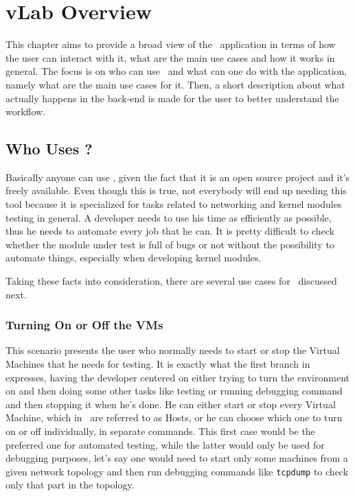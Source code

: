 \chapter{vLab Overview}
\label{chapter:Chapter 3}

This chapter aims to provide a broad view of the \project\ application in terms of how the user can interact with it, what are the main use cases and how it works in general.
The focus is on who can use \project\ and what can one do with the application, namely what are the main use cases for it.
Then, a short description about what actually happens in the back-end is made for the user to better understand the workflow.

\section{Who Uses \project?}
\label{sec:who-uses-vlab}

Basically anyone can use \project, given the fact that it is an open source project and it's freely available.
Even though this is true, not everybody will end up needing this tool because it is specialized for tasks related to networking and kernel modules testing in general.
A developer needs to use his time as efficiently as possible, thus he needs to automate every job that he can.
It is pretty difficult to check whether the module under test is full of bugs or not without the possibility to automate things, especially when developing kernel modules.

Taking these facts into consideration, there are several use cases for \project\ discussed next.

\subsection{Turning On or Off the VMs}
\label{sub-sec:turning-on-off-vms}


This scenario presents the user who normally needs to start or stop the Virtual Machines that he needs for testing.
It is exactly what the first branch in  expresses, having the developer centered on either trying to turn the environment on and then doing some other tasks like testing or running debugging command and then stopping it when he's done.
He can either start or stop every Virtual Machine, which in \project\ are referred to as Hosts, or he can choose which one to turn on or off individually, in separate commands.
This first case would be the preferred one for automated testing, while the latter would only be used for debugging purposes, let's say one would need to start only some machines from a given network topology and then run debugging commands like \texttt{tcpdump} to check only that part in the topology.

